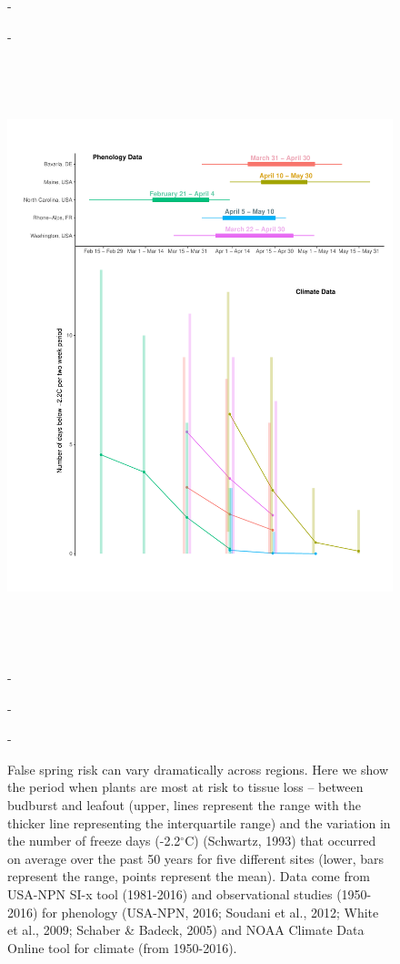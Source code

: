 \documentclass{article}\usepackage[]{graphicx}\usepackage[]{color}
\begin{document}
\begin{figure} [H] 
 -\begin{center}
 -\includegraphics[width=16cm, height=18cm]{..//figure/RegRisk_flipped.pdf} 
 -\caption{False spring risk can vary dramatically across regions. Here we show the period when plants are most at risk to tissue loss -- between budburst and leafout (upper, lines represent the range with the thicker line representing the interquartile range) and the variation in the number of freeze days (-2.2$^{\circ}$C) (Schwartz, 1993) that occurred on average over the past 50 years for five different sites (lower, bars represent the range, points represent the mean). Data come from USA-NPN SI-x tool (1981-2016) and observational studies (1950-2016) for phenology (USA-NPN, 2016; Soudani et al., 2012; White et al., 2009; Schaber \& Badeck, 2005) and NOAA Climate Data Online tool for climate (from 1950-2016). } \label{fig:regional}  
 -\end{center}
 -\end{figure}
\end{document}
